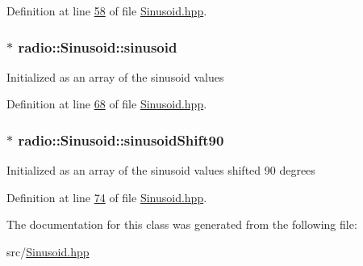Definition at line \hyperlink{Sinusoid_8hpp_source_l00058}{58} of file \hyperlink{Sinusoid_8hpp_source}{Sinusoid.\+hpp}.

\hypertarget{classradio_1_1Sinusoid_a56556c3d3e08d1c9481c18e087ff1c85}{
\subsubsection[{sinusoid}]{$\ast$ radio\+::\+Sinusoid\+::sinusoid\hspace{0.3cm}{\ttfamily [protected]}}}\label{classradio_1_1Sinusoid_a56556c3d3e08d1c9481c18e087ff1c85}
Initialized as an array of the sinusoid values 

Definition at line \hyperlink{Sinusoid_8hpp_source_l00068}{68} of file \hyperlink{Sinusoid_8hpp_source}{Sinusoid.\+hpp}.

\hypertarget{classradio_1_1Sinusoid_a556db1dca1d5af3d9c6ba2d51f9e3cf8}{
\subsubsection[{sinusoid\+Shift90}]{$\ast$ radio\+::\+Sinusoid\+::sinusoid\+Shift90\hspace{0.3cm}{\ttfamily [protected]}}}\label{classradio_1_1Sinusoid_a556db1dca1d5af3d9c6ba2d51f9e3cf8}
Initialized as an array of the sinusoid values shifted 90 degrees 

Definition at line \hyperlink{Sinusoid_8hpp_source_l00074}{74} of file \hyperlink{Sinusoid_8hpp_source}{Sinusoid.\+hpp}.



The documentation for this class was generated from the following file\+:\begin{DoxyCompactItemize}
\item 
src/\hyperlink{Sinusoid_8hpp}{Sinusoid.\+hpp}\end{DoxyCompactItemize}
